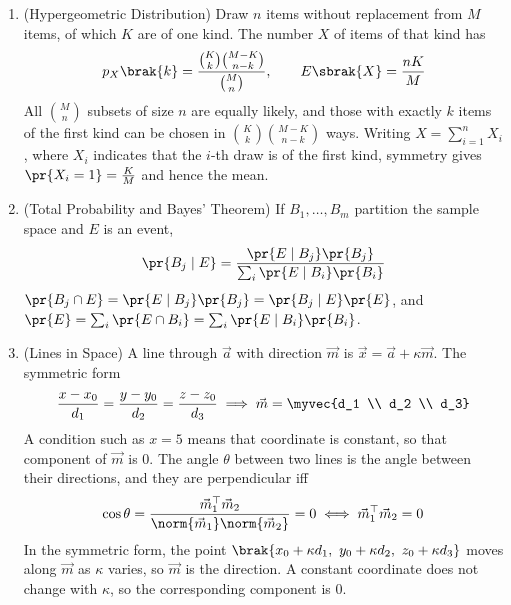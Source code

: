 \begin{enumerate}[label=\thesubsection.\arabic*, ref=\thesubsection.\theenumi,itemsep=1.5em]
\item (Hypergeometric Distribution) Draw $n$ items without replacement from $M$ items, of which $K$ are of one kind. The number $X$ of items of that kind has
\begin{align}
p_X\brak{k} = \frac{\binom{K}{k}\binom{M-K}{n-k}}{\binom{M}{n}}, \qquad E\sbrak{X} = \frac{nK}{M}
\label{eq:EE26BTECH11218-cb12-hyper}
\end{align}
\solution All $\binom{M}{n}$ subsets of size $n$ are equally likely, and those with exactly $k$ items of the first kind can be chosen in $\binom{K}{k}\binom{M-K}{n-k}$ ways. Writing $X=\sum_{i=1}^{n}X_i$, where $X_i$ indicates that the $i$-th draw is of the first kind, symmetry gives $\pr{X_i=1}=\frac{K}{M}$ and hence the mean.

\item (Total Probability and Bayes' Theorem) If $B_1,\dots,B_m$ partition the sample space and $E$ is an event,
\begin{align}
\pr{B_j\mid E} = \frac{\pr{E\mid B_j}\pr{B_j}}{\sum_{i}\pr{E\mid B_i}\pr{B_i}}
\label{eq:EE26BTECH11218-cb12-bayes}
\end{align}
\solution $\pr{B_j\cap E} = \pr{E\mid B_j}\pr{B_j} = \pr{B_j\mid E}\pr{E}$, and $\pr{E}=\sum_i\pr{E\cap B_i} = \sum_i\pr{E\mid B_i}\pr{B_i}$.

\item (Lines in Space) A line through $\vec{a}$ with direction $\vec{m}$ is $\vec{x}=\vec{a}+\kappa\vec{m}$. The symmetric form
\begin{align}
\frac{x-x_0}{d_1} = \frac{y-y_0}{d_2} = \frac{z-z_0}{d_3} \implies \vec{m} = \myvec{d_1 \\ d_2 \\ d_3}
\label{eq:EE26BTECH11218-cb12-symm}
\end{align}
A condition such as $x=5$ means that coordinate is constant, so that component of $\vec{m}$ is $0$. The angle $\theta$ between two lines is the angle between their directions, and they are perpendicular iff
\begin{align}
\cos\theta = \frac{\vec{m}_1^{\top}\vec{m}_2}{\norm{\vec{m}_1}\norm{\vec{m}_2}} = 0 \iff \vec{m}_1^{\top}\vec{m}_2 = 0
\label{eq:EE26BTECH11218-cb12-perp}
\end{align}
\solution In the symmetric form, the point $\brak{x_0+\kappa d_1,\ y_0+\kappa d_2,\ z_0+\kappa d_3}$ moves along $\vec{m}$ as $\kappa$ varies, so $\vec{m}$ is the direction. A constant coordinate does not change with $\kappa$, so the corresponding component is $0$.


\end{enumerate}
